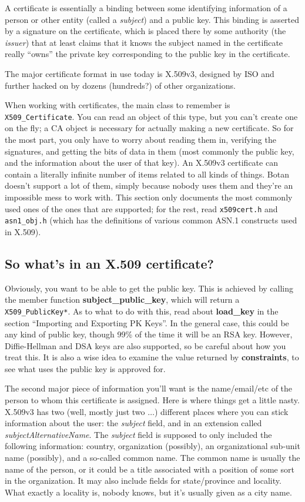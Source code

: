 \documentclass{article}
\newcommand{\filename}[1]{\texttt{#1}}
\newcommand{\function}[1]{\textbf{#1}}
\newcommand{\type}[1]{\texttt{#1}}
\begin{document}
A certificate is essentially a binding between some identifying information of
a person or other entity (called a \emph{subject}) and a public key. This
binding is asserted by a signature on the certificate, which is placed there by
some authority (the \emph{issuer}) that at least claims that it knows the
subject named in the certificate really ``owns'' the private key
corresponding to the public key in the certificate.

The major certificate format in use today is X.509v3, designed by ISO and
further hacked on by dozens (hundreds?) of other organizations.

When working with certificates, the main class to remember is
\type{X509\_Certificate}. You can read an object of this type, but you can't
create one on the fly; a CA object is necessary for actually making a new
certificate. So for the most part, you only have to worry about reading them
in, verifying the signatures, and getting the bits of data in them (most
commonly the public key, and the information about the user of that key). An
X.509v3 certificate can contain a literally infinite number of items related to
all kinds of things. Botan doesn't support a lot of them, simply because nobody
uses them and they're an impossible mess to work with. This section only
documents the most commonly used ones of the ones that are supported; for the
rest, read \filename{x509cert.h} and \filename{asn1\_obj.h} (which has the
definitions of various common ASN.1 constructs used in X.509).

\subsection{So what's in an X.509 certificate?}

Obviously, you want to be able to get the public key. This is achieved by
calling the member function \function{subject\_public\_key}, which will return
a \type{X509\_PublicKey*}. As to what to do with this, read about
\function{load\_key} in the section ``Importing and Exporting PK Keys''. In the
general case, this could be any kind of public key, though 99\% of the time it
will be an RSA key. However, Diffie-Hellman and DSA keys are also supported, so
be careful about how you treat this. It is also a wise idea to examine the
value returned by \function{constraints}, to see what uses the public key is
approved for.

The second major piece of information you'll want is the name/email/etc of the
person to whom this certificate is assigned. Here is where things get a little
nasty. X.509v3 has two (well, mostly just two $\ldots$) different places where
you can stick information about the user: the \emph{subject} field, and in an
extension called \emph{subjectAlternativeName}. The \emph{subject} field is
supposed to only included the following information: country, organization
(possibly), an organizational sub-unit name (possibly), and a so-called common
name. The common name is usually the name of the person, or it could be a title
associated with a position of some sort in the organization. It may also
include fields for state/province and locality. What exactly a locality is,
nobody knows, but it's usually given as a city name.
\end{document}
